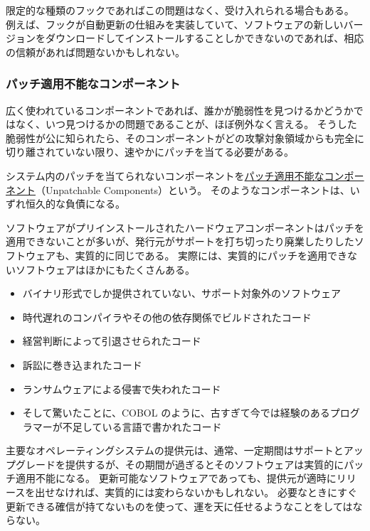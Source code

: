 \documentclass[uplatex]{jsarticle}
\def\label#1{}%
\begin{document}
\begin{rem}[限定的なフック]\label{rem:ch4-limited-hooks}
限定的な種類のフックであればこの問題はなく、受け入れられる場合もある。
例えば、フックが自動更新の仕組みを実装していて、ソフトウェアの新しいバージョンをダウンロードしてインストールすることしかできないのであれば、相応の信頼があれば問題ないかもしれない。
\end{rem}

\subsubsection{パッチ適用不能なコンポーネント}

広く使われているコンポーネントであれば、誰かが脆弱性を見つけるかどうかではなく、いつ見つけるかの問題であることが、ほぼ例外なく言える。
そうした脆弱性が公に知られたら、そのコンポーネントがどの攻撃対象領域からも完全に切り離されていない限り、速やかにパッチを当てる必要がある。

\begin{dfn}[パッチ適用不能なコンポーネント]\label{dfn:ch4-unpatchable-components}
システム内のパッチを当てられないコンポーネントを\underline{パッチ適用不能なコンポーネント}（Unpatchable Components）という。
そのようなコンポーネントは、いずれ恒久的な負債になる。
\end{dfn}

ソフトウェアがプリインストールされたハードウェアコンポーネントはパッチを適用できないことが多いが、発行元がサポートを打ち切ったり廃業したりしたソフトウェアも、実質的に同じである。
実際には、実質的にパッチを適用できないソフトウェアはほかにもたくさんある。
\begin{itemize}
\item バイナリ形式でしか提供されていない、サポート対象外のソフトウェア
\item 時代遅れのコンパイラやその他の依存関係でビルドされたコード
\item 経営判断によって引退させられたコード
\item 訴訟に巻き込まれたコード
\item ランサムウェアによる侵害で失われたコード
\item そして驚いたことに、COBOL のように、古すぎて今では経験のあるプログラマーが不足している言語で書かれたコード
\end{itemize}
主要なオペレーティングシステムの提供元は、通常、一定期間はサポートとアップグレードを提供するが、その期間が過ぎるとそのソフトウェアは実質的にパッチ適用不能になる。
更新可能なソフトウェアであっても、提供元が適時にリリースを出せなければ、実質的には変わらないかもしれない。
必要なときにすぐ更新できる確信が持てないものを使って、運を天に任せるようなことをしてはならない。
\end{document}
